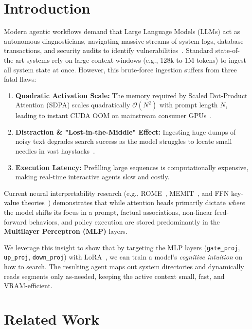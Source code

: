 \documentclass[10pt,twocolumn]{article}
\begin{document}
\section{Introduction}
Modern agentic workflows demand that Large Language Models (LLMs) act as autonomous diagnosticians, navigating massive streams of system logs, database transactions, and security audits to identify vulnerabilities~\cite{schneider2025agents}. Standard state-of-the-art systems rely on large context windows (e.g., 128k to 1M tokens) to ingest all system state at once. However, this brute-force ingestion suffers from three fatal flaws:
\begin{enumerate}
    \item \textbf{Quadratic Activation Scale:} The memory required by Scaled Dot-Product Attention (SDPA) scales quadratically $\mathcal{O}(N^2)$ with prompt length $N$, leading to instant CUDA OOM on mainstream consumer GPUs~\cite{vaswani2017attention}.
    \item \textbf{Distraction \& "Lost-in-the-Middle" Effect:} Ingesting huge dumps of noisy text degrades search success as the model struggles to locate small needles in vast haystacks~\cite{liu2024lost}.
    \item \textbf{Execution Latency:} Prefilling large sequences is computationally expensive, making real-time interactive agents slow and costly.
\end{enumerate}

Current neural interpretability research (e.g., ROME~\cite{meng2022rome}, MEMIT~\cite{meng2023memit}, and FFN key-value theories~\cite{geva2021transformer, geva2022transformer}) demonstrates that while attention heads primarily dictate \textit{where} the model shifts its focus in a prompt, factual associations, non-linear feed-forward behaviors, and policy execution are stored predominantly in the \textbf{Multilayer Perceptron (MLP)} layers. 

We leverage this insight to show that by targeting the MLP layers (\texttt{gate\_proj}, \texttt{up\_proj}, \texttt{down\_proj}) with LoRA~\cite{hu2021lora}, we can train a model's \textit{cognitive intuition} on how to search. The resulting agent maps out system directories and dynamically reads segments only as-needed, keeping the active context small, fast, and VRAM-efficient.

\section{Related Work}
\end{document}
